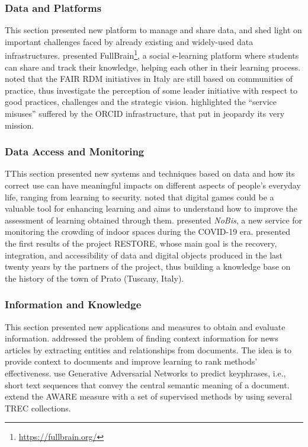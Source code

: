\documentclass[sigconf, nonacm]{acmart}
\begin{document}
\subsubsection*{Data and Platforms}
This section presented new platform to manage and share data, and shed light on important challenges faced by already existing and widely-used data infrastructures.
\citet{biasini2021fullbrain} presented FullBrain\footnote{\url{https://fullbrain.org/}}, a social e-learning platform where students can share and track their knowledge, helping each other in their learning process.
\citet{GargiuloGTZ21} noted that the FAIR RDM initiatives in Italy are still based on communities of practice, thus investigate the perception of some leader initiative with respect to good practices, challenges and the strategic vision. 
\citet{BaglioniMMABB21} highlighted the ``service misuses'' suffered by the ORCID infrastructure, that put in jeopardy its very mission.

\subsubsection*{Data Access and Monitoring}
TThis section presented new systems and techniques based on data and how its correct use can have meaningful impacts on different aspects of people's everyday life, ranging from learning to security.
\citet{ZanichelliETTC21} noted that digital games could be a valuable tool for enhancing learning and aims to understand how to improve the assessment of learning obtained through them.
\citet{AvanziCCG021} presented \emph{NoBis}, a new service for monitoring the crowding of indoor spaces during the COVID-19 era.
\citet{SpadiSD21} presented the first results of the project RESTORE, whose main goal is the recovery, integration, and accessibility of data and digital objects produced in the last twenty years by the partners of the project, thus building a knowledge base on the history of the town of Prato (Tuscany, Italy).


\subsubsection*{Information and Knowledge}
This section presented new applications and measures to obtain and evaluate information. 
\citet{IrreraS21} addressed the problem of finding context information for news articles by extracting entities and relationships from documents. The idea is to provide context to documents and improve learning to rank methods' effectiveness.
\citet{LancioniMP0T21} use Generative Adversarial Networks to predict keyphrases, i.e., short text sequences that convey the central semantic meaning of a document. 
\citet{Ferrante0P21} extend the AWARE measure with a set of supervised methods by using several TREC collections. 
\end{document}
